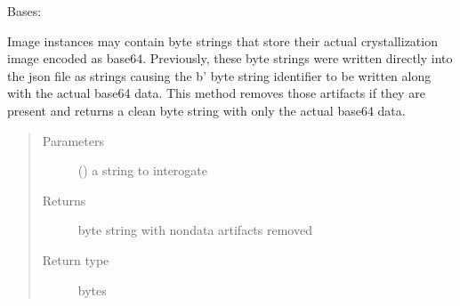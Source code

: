 \documentclass[letterpaper,10pt,english]{sphinxmanual}
\begin{document}
\begin{fulllineitems}
\label{\detokenize{polo.utils:polo.utils.io_utils.RunDeserializer}}
Bases: 

\begin{fulllineitems}
\label{\detokenize{polo.utils:polo.utils.io_utils.RunDeserializer.clean_base64_string}}
Image instances may contain byte strings that store their actual
crystallization image encoded as base64. Previously, these byte strings
were written directly into the json file as strings causing the b’
byte string identifier to be written along with the actual base64 data.
This method removes those artifacts if they are present and returns a
clean byte string with only the actual base64 data.
\begin{quote}\begin{description}
\item[{Parameters}] \leavevmode
{} () \textendash{} a string to interogate

\item[{Returns}] \leavevmode
byte string with non\sphinxhyphen{}data artifacts removed

\item[{Return type}] \leavevmode
bytes

\end{description}\end{quote}

\end{fulllineitems}



\end{fulllineitems}
\end{document}
